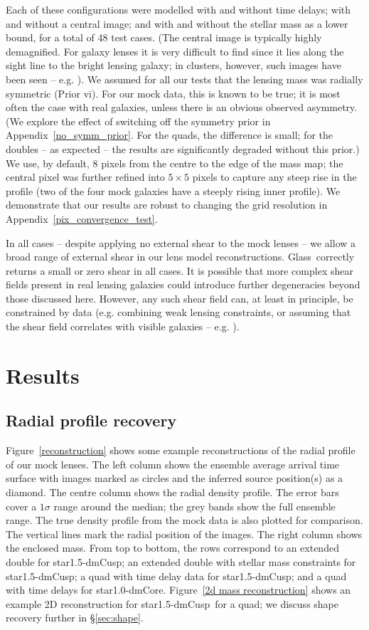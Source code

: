 \documentclass[galley,usenatbib]{mn2e}
\newcommand{\Glass}{{\sc Glass}}
\newcommand{\figref}[1] {Figure~\ref{#1}}
\newcommand{\secref}[1] {\S\ref{#1}}
\newcommand{\appref}[1] {Appendix~\ref{#1}}
\newcommand{\mockAA}{{\sc star1.0-dmCore}}
\newcommand{\mockBC}{{\sc star1.5-dmCusp}}
\begin{document}
Each of these configurations were modelled with and without time delays; with
and without a central image; and with and without the stellar mass as a lower
bound, for a total of 48 test cases. (The central image is typically highly
demagnified. For galaxy lenses it is very difficult to find since it lies along
the sight line to the bright lensing galaxy; in clusters, however, such images
have been seen -- e.g. \citealt{2005PASJ...57L...7I}). We assumed for all our
tests that the lensing mass was radially symmetric (Prior vi). For our mock
data, this is known to be true; it is most often the case with real galaxies,
unless there is an obvious observed asymmetry. (We explore the effect of
switching off the symmetry prior in \appref{no_symm_prior}. For the
quads, the difference is small; for the doubles -- as expected -- the results
are significantly degraded without this prior.) We use, by default, 8 pixels
from the centre to the edge of the mass map; the central pixel was further
refined into $5\times5$ pixels to capture any steep rise in the profile (two of
the four mock galaxies have a steeply rising inner profile). We demonstrate
that our results are robust to changing the grid resolution in 
\appref{pix_convergence_test}.

In all cases -- despite applying no external shear to the mock lenses -- we
allow a broad range of external shear in our lens model reconstructions.
\Glass\ correctly returns a small or zero shear in all cases. It is possible
that more complex shear fields present in real lensing galaxies could introduce
further degeneracies beyond those discussed here. However, any such shear field
can, at least in principle, be constrained by data (e.g. combining weak lensing
constraints, or assuming that the shear field correlates with visible galaxies
-- e.g. \citealt{2009A&A...500..681M,2011ApJ...726...84W}).

\section{Results}\label{sec:results}

\subsection{Radial profile recovery}

\figref{reconstruction} shows some example reconstructions of the radial
profile of our mock lenses. The left column shows the ensemble average arrival
time surface with images marked as circles and the inferred source position(s)
as a diamond. The centre column shows the radial density profile. The error
bars cover a $1\sigma$ range around the median; the grey bands show the full
ensemble range. The true density profile from the mock data is also plotted for
comparison. The vertical lines mark the radial position of the images. The
right column shows the enclosed mass. From top to bottom, the rows correspond
to an extended double for \mockBC; an extended double with stellar mass
constraints for \mockBC; a quad with time delay data for \mockBC; and a quad
with time delays for \mockAA. \figref{2d mass reconstruction} shows an example
2D reconstruction for \mockBC\ for a quad; we discuss shape recovery further in
\secref{sec:shape}.
\end{document}
